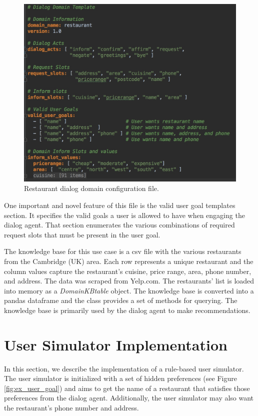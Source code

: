 \begin{figure}[h!]
	\centering
	\includegraphics[scale=.25]{diagrams/sample_domain.jpeg}
	\caption{ Restaurant dialog domain configuration file. }
	\label{fig:restaurant_domain}
\end{figure}

One important and novel feature of this file is the valid user goal templates section. It specifies the valid goals a user is allowed to have when engaging the dialog agent. That section enumerates the various combinations of required request slots that must be present in the user goal.

The knowledge base for this use case is a csv file with the various restaurants from the Cambridge (UK) area. Each row represents a unique restaurant and the column values capture the restaurant's cuisine, price range, area, phone number, and address. The data was scraped from Yelp.com. The restaurants' list is loaded into memory as a \textit{DomainKBtable} object. The knowledge base is converted into a pandas dataframe and the class provides a set of methods for querying. The knowledge base is primarily used by the dialog agent to make recommendations.

\section{User Simulator Implementation}

In this section, we describe the implementation of a rule-based user simulator. The user simulator is initialized with a set of hidden preferences (see Figure \ref{fig:ex_user_goal}) and aims to get the name of a restaurant that satisfies those preferences from the dialog agent. Additionally, the user simulator may also want the restaurant's phone number and address.

